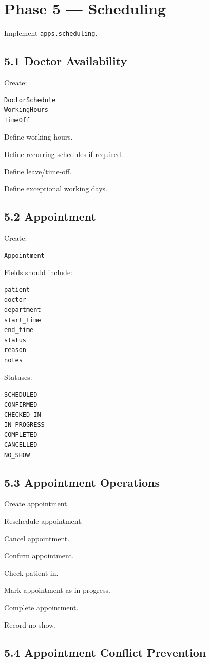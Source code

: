 \documentclass[11pt,a4paper]{article}
\newcommand{\task}[1]{\item[$\square$] #1}
\begin{document}
\section{Phase 5 --- Scheduling}

Implement \texttt{apps.scheduling}.

\subsection{5.1 Doctor Availability}

Create:

\begin{lstlisting}
DoctorSchedule
WorkingHours
TimeOff
\end{lstlisting}

\task{Define working hours.}
\task{Define recurring schedules if required.}
\task{Define leave/time-off.}
\task{Define exceptional working days.}

\subsection{5.2 Appointment}

Create:

\begin{lstlisting}
Appointment
\end{lstlisting}

Fields should include:

\begin{lstlisting}
patient
doctor
department
start_time
end_time
status
reason
notes
\end{lstlisting}

Statuses:

\begin{lstlisting}
SCHEDULED
CONFIRMED
CHECKED_IN
IN_PROGRESS
COMPLETED
CANCELLED
NO_SHOW
\end{lstlisting}

\subsection{5.3 Appointment Operations}

\task{Create appointment.}
\task{Reschedule appointment.}
\task{Cancel appointment.}
\task{Confirm appointment.}
\task{Check patient in.}
\task{Mark appointment as in progress.}
\task{Complete appointment.}
\task{Record no-show.}

\subsection{5.4 Appointment Conflict Prevention}
\end{document}
